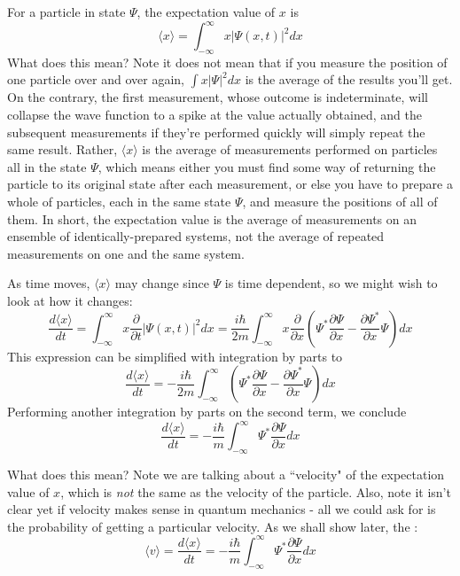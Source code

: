 \documentclass[12pt, a4paper, oneside, openright, titlepage]{book}
\begin{document}
For a particle in state $\Psi$, the expectation value of $x$ is \begin{equation*}
    \boxed{\langle x\rangle = \int_{-\infty}^{\infty}x|\Psi(x,t)|^2dx}
\end{equation*}
What does this mean? Note it does not mean that if you measure the position of one particle over and over again, $\int x|\Psi|^2dx$ is the average of the results you'll get. On the contrary, the first measurement, whose outcome is indeterminate, will collapse the wave function to a spike at the value actually obtained, and the subsequent measurements if they're performed quickly will simply repeat the same result. Rather, $\langle x\rangle$ is the average of measurements performed on particles all in the state $\Psi$, which means either you must find some way of returning the particle to its original state after each measurement, or else you have to prepare a whole  of particles, each in the same state $\Psi$, and measure the positions of all of them. In short, the expectation value is the average of measurements on an ensemble of identically-prepared systems, not the average of repeated measurements on one and the same system.

As time moves, $\langle x\rangle$ may change since $\Psi$ is time dependent, so we might wish to look at how it changes: \begin{equation*}
    \frac{d\langle x\rangle}{dt} = \int_{-\infty}^{\infty}x\frac{\partial}{\partial t}|\Psi(x,t)|^2dx = \frac{i\hbar}{2m}\int_{-\infty}^{\infty}x\frac{\partial}{\partial x}\left(\Psi^*\frac{\partial\Psi}{\partial x} - \frac{\partial \Psi^*}{\partial x}\Psi\right)dx
\end{equation*}
This expression can be simplified with integration by parts to $$\frac{d\langle x\rangle}{dt} = -\frac{i\hbar}{2m}\int_{-\infty}^{\infty}\left(\Psi^*\frac{\partial \Psi}{\partial x} - \frac{\partial \Psi^*}{\partial x}\Psi\right)dx$$
Performing another integration by parts on the second term, we conclude $$\frac{d\langle x\rangle}{dt} = -\frac{i\hbar}{m}\int_{-\infty}^{\infty}\Psi^*\frac{\partial \Psi}{\partial x}dx$$

What does this mean? Note we are talking about a ``velocity" of the expectation value of $x$, which is \emph{not} the same as the velocity of the particle. Also, note it isn't clear yet if velocity makes sense in quantum mechanics - all we could ask for is the probability of getting a particular velocity. As we shall show later, the : $$\langle v\rangle = \frac{d\langle x\rangle}{dt} =  -\frac{i\hbar}{m}\int_{-\infty}^{\infty}\Psi^*\frac{\partial \Psi}{\partial x}dx$$
\end{document}

